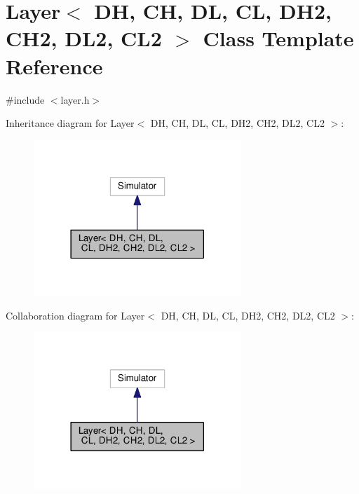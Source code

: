 \hypertarget{classLayer}{}\section{Layer$<$ DH, CH, DL, CL, D\+H2, C\+H2, D\+L2, C\+L2 $>$ Class Template Reference}
\label{classLayer}


{\ttfamily \#include $<$layer.\+h$>$}



Inheritance diagram for Layer$<$ DH, CH, DL, CL, D\+H2, C\+H2, D\+L2, C\+L2 $>$\+:\nopagebreak
\begin{figure}[H]
\begin{center}
\leavevmode
\includegraphics[width=222pt]{classLayer__inherit__graph}
\end{center}
\end{figure}


Collaboration diagram for Layer$<$ DH, CH, DL, CL, D\+H2, C\+H2, D\+L2, C\+L2 $>$\+:\nopagebreak
\begin{figure}[H]
\begin{center}
\leavevmode
\includegraphics[width=222pt]{classLayer__coll__graph}
\end{center}
\end{figure}
